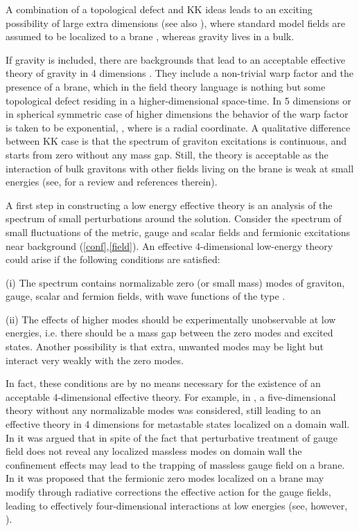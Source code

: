 \documentclass[a4paper,12pt]{article}
\begin{document}
A combination of a topological defect and KK ideas leads to an
exciting possibility of large extra dimensions 
\cite{Arkani-Hamed:1998rs} (see also \cite{Antoniadis:1990ew}), where
standard model fields are assumed to be  localized to a brane
\cite{Polchinski:1995mt}, whereas gravity lives in a bulk.

If gravity is included, there are backgrounds that lead to an
acceptable effective theory of gravity in 4 dimensions
\cite{Randall:1999vf}. They include a non-trivial warp factor
\cite{Rubakov:1983bz} \coordHE{} and the presence of a brane,
which in the field theory language is nothing but some topological
defect residing in a higher-dimensional space-time. In 5 dimensions
\cite{Randall:1999vf} or in spherical symmetric case of higher
dimensions
\cite{Gherghetta:2000qi,Gherghetta:2000jf,Giovannini:2001hh} the
behavior of the warp factor is taken to be exponential, \coordHE{}, where \coordHE{} is a radial coordinate. A qualitative
difference between KK case is that the spectrum of graviton
excitations is continuous, and starts from zero without any mass gap.
Still, the theory is acceptable as the interaction of bulk gravitons
with other fields living on the brane is weak at small energies (see,
for a review \cite{Rubakov:2001kp} and references therein).

A first step in constructing a low energy effective theory is an
analysis of the spectrum of small perturbations around the solution.
Consider the spectrum of small fluctuations of the metric, gauge and
scalar fields and fermionic excitations near background
(\ref{conf},\ref{field}). An effective 4-dimensional low-energy
theory could arise if the following conditions are satisfied:

(i) The spectrum contains normalizable zero (or small mass) modes of
graviton, gauge, scalar and fermion fields, with wave functions of
the type \coordHE{}.

(ii) The effects of higher modes should be experimentally
unobservable at low energies, i.e. there should be a mass gap between
the zero modes and excited states. Another possibility is that extra,
unwanted modes may be light but interact very weakly with the zero
modes.

In fact, these conditions are by no means necessary for the existence
of an acceptable 4-dimensional effective theory. For example, in
\cite{Dubovsky:2000am}, a five-dimensional theory without any
normalizable modes was considered, still leading to an effective
theory in 4 dimensions for metastable states localized on a domain
wall. In \cite{Dvali:1996xe,Dvali:1996bg} it was argued that in spite
of the fact that perturbative treatment of gauge field does not
reveal any localized massless modes on domain wall the confinement
effects may lead to the trapping of massless gauge field on a brane.
In \cite{Dvali:2000rx} it was proposed that the fermionic zero modes
localized on a brane may modify through radiative corrections the
effective action for the gauge fields, leading to effectively
four-dimensional interactions at low energies (see, however,
\cite{Dubovsky:2001pe}).
\end{document}
